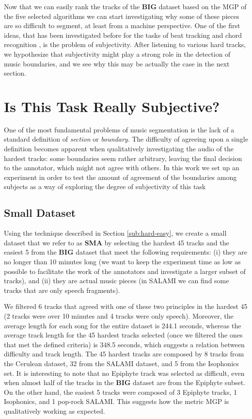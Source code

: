 \documentclass{article}
\begin{document}
Now that we can easily rank the tracks of the \textbf{BIG} dataset based on the MGP of the five selected algorithms we can start investigating why some of these pieces are so difficult to segment, at least from a machine perspective. 
One of the first ideas, that has been investigated before for the tasks of beat tracking \cite{Grosche2010} and chord recognition \cite{Ni2013}, is the problem of subjectivity.
After listening to various hard tracks, we hypothesize that subjectivity might play a strong role in the detection of music boundaries, and we see why this may be actually the case in the next section. 

\section{Is This Task Really Subjective?}

One of the most fundamental problems of music segmentation is the lack of a standard definition of \textit{section} or \textit{boundary}. 
The difficulty of agreeing upon a single definition becomes apparent when qualitatively investigating the audio of the hardest tracks: some boundaries seem rather arbitrary, leaving the final decision to the annotator, which might not agree with others.
In this work we set up an experiment in order to test the amount of agreement of the boundaries among subjects as a way of exploring the degree of subjectivity of this task

\subsection{Small Dataset}

Using the technique described in Section \ref{sub:hard-easy}, we create a small dataset that we refer to as \textbf{SMA} by selecting the hardest 45 tracks and the easiest 5 from the \textbf{BIG} dataset that meet the following requirements: (i) they are no longer than 10 minutes long (we want to keep the experiment time as low as possible to facilitate the work of the annotators and investigate a larger subset of tracks), and (ii) they are actual music pieces (in SALAMI we can find some tracks that are only speech fragments).

We filtered 6 tracks that agreed with one of these two principles in the hardest 45 (2 tracks were over 10 minutes and 4 tracks were only speech). 
Moreover, the average length for each song for the entire dataset is 244.1 seconds, whereas the average track length for the 45 hardest tracks selected (once we filtered the ones that met the defined criteria) is 348.5 seconds, which suggests a relation between difficulty and track length.
The 45 hardest tracks are composed by 8 tracks from the Cerulean dataset, 32 from the SALAMI dataset, and 5 from the Isophonics set.
It is interesting to note that no Epiphyte track was selected as difficult, even when almost half of the tracks in the \textbf{BIG} dataset are from the Epiphyte subset.
On the other hand, the easiest 5 tracks were composed of 3 Epiphyte tracks, 1 Isophonics, and 1 pop-rock SALAMI.
This suggests how the metric MGP is qualitatively working as expected.
\end{document}

